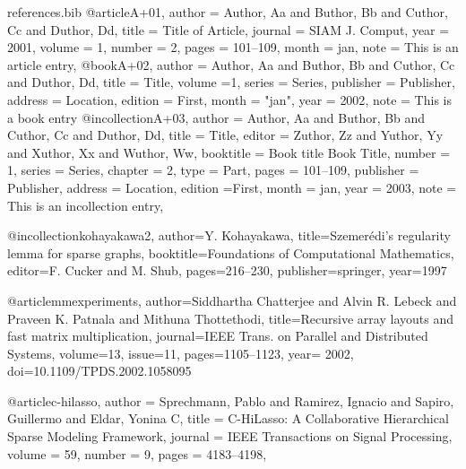 \RequirePackage{filecontents}
\begin{filecontents}{references.bib}
@article{A+01,
  author = {Author, Aa and Buthor, Bb and Cuthor, Cc and Duthor, Dd},
  title = {Title of Article},
  journal = {SIAM J. Comput},
  year = {2001},
  volume = {1},
  number = {2},
  pages = {101--109},
  month = jan,
  note = {This is an article entry},
}
@book{A+02,
  author = {Author, Aa and Buthor, Bb and Cuthor, Cc and Duthor, Dd},
  title = {Title},
  volume ={1},
  series = {Series},
  publisher = {Publisher},
  address = {Location},
  edition = {First},
  month = "jan",
  year = {2002},
  note = {This is a book entry}
}
@incollection{A+03,
  author = {Author, Aa and Buthor, Bb and Cuthor, Cc and Duthor, Dd},
  title = {Title},
  editor = {Zuthor, Zz and Yuthor, Yy and Xuthor, Xx and Wuthor, Ww},
  booktitle = {Book title Book Title},
  number = {1},
  series = {Series},
  chapter = {2},
  type = {Part},
  pages = {101--109},
  publisher = {Publisher},
  address = {Location},
  edition ={First},
  month = jan,
  year = {2003},
  note = {This is an incollection entry},
}

@incollection{kohayakawa2,
author={Y. Kohayakawa},
title={{Szemer\'{e}di's} regularity lemma for sparse graphs},
booktitle={Foundations of Computational Mathematics},
editor={F. Cucker and M. Shub},
pages={216--230},
publisher=springer,
year={1997}
}

@article{mmexperiments,
author={Siddhartha Chatterjee and  Alvin R. Lebeck and  Praveen K. Patnala and Mithuna Thottethodi},
title={Recursive array layouts and fast matrix multiplication},
journal={IEEE Trans. on Parallel and Distributed Systems},
volume={13},
issue={11},
pages={1105--1123},
year= {2002},
doi={10.1109/TPDS.2002.1058095}
}

@article{c-hilasso,
    author = {Sprechmann, Pablo and Ramirez, Ignacio and Sapiro, Guillermo and Eldar, Yonina C},
    title = {{C-HiLasso}: A Collaborative Hierarchical Sparse Modeling Framework},
    journal = {IEEE Transactions on Signal Processing},
    volume = {59},
    number = {9},
    pages = {4183--4198},
}

\end{filecontents}

\documentclass{article}
\providecommand\noopsort[1]{}
\usepackage{xpatch}
\usepackage[%
 backend   =  biber   , 
 style     = trad-plain,
]{biblatex}




\nocite{*}
\printbibliography


